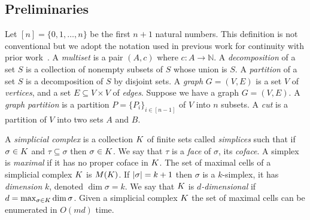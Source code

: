 \documentclass{jocg}
\begin{document}
\subsection{Preliminaries}
Let $[n] = \{ 0,1, \ldots ,n \}$ be the first $n+1$ natural numbers. This
definition is not conventional but we adopt the notation used
in previous work for continuity with prior work~\cite{zc-lh-08}. A \emph{multiset}
is a pair $(A,c)$ where $c: A \rightarrow \mathbb{N}$. A \emph{decomposition}
of a set $S$ is a collection of nonempty subsets of $S$ whose union is $S$.
A \emph{partition} of a set $S$ is a decomposition of $S$ by disjoint sets.
A \emph{graph} $G = (V,E)$ is a set $V$ of \emph{vertices}, and 
a set $E \subseteq V \times V$  of \emph{edges}. 
Suppose we have a graph $G = (V,E)$. A \emph{graph partition} is a partition 
$P = \{P_i\}_{i \in [n-1]}$ of $V$ into $n$ subsets. 
A \emph{cut} is a partition of $V$ into two sets $A$ and $B$. 

A \emph{simplicial complex} is a collection $K$ of finite sets called
\emph{simplices} such that if $\sigma \in K$ and $\tau \subseteq \sigma$ then 
$\sigma \in K$. 
We say that $\tau$ is a \emph{face} of $\sigma$, its \emph{coface}. A simplex
is \emph{maximal} if it has no proper coface in $K$. The set of maximal cells of a 
simplicial complex $K$ is $M(K)$. If $|\sigma| = k+1$
then $\sigma$ is a $k$-simplex, it has \emph{dimension} $k$, denoted 
$\dim{\sigma} = k$. We say that $K$ is \emph{$d$-dimensional} if 
$d = \max_{\sigma \in K} \dim{\sigma}$. 
Given a simplicial complex $K$ the set of maximal 
cells can be enumerated in $O(md)$ time.
\end{document}
